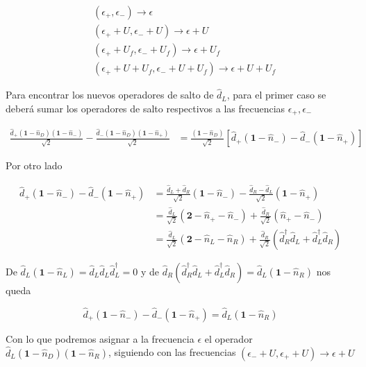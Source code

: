\begin{appendixs}
\begin{align*}
    &(\epsilon_{+},\epsilon_{-})  \to \epsilon \\
    &(\epsilon_{+}+U,\epsilon_{-}+U)  \to \epsilon+U \\
    &(\epsilon_{+}+U_{f},\epsilon_{-}+U_{f})  \to \epsilon+U_{f} \\
    &(\epsilon_{+}+U+U_{f},\epsilon_{-}+U+U_{f})  \to \epsilon+U+U_{f} 
\end{align*}

Para encontrar los nuevos operadores de salto de $\hat{d}_{L}$, para el primer caso se deberá sumar los operadores de salto respectivos a las frecuencias $\epsilon_{+},\epsilon_{-}$ 

\begin{align*}
    \frac{\hat{d}_{+}(\textbf{1}-\hat{n}_{D})(\textbf{1}-\hat{n}_{-})}{\sqrt{2}} - \frac{\hat{d}_{-}(\textbf{1}-\hat{n}_{D})(\textbf{1}-\hat{n}_{+})}{\sqrt{2}} & = \frac{(\textbf{1}-\hat{n}_{D})}{\sqrt{2}} [\hat{d}_{+}(\textbf{1}-\hat{n}_{-}) - \hat{d}_{-}(\textbf{1}-\hat{n}_{+}) ]
\end{align*}

Por otro lado

\begin{align*}
    \hat{d}_{+}(\textbf{1}-\hat{n}_{-}) - \hat{d}_{-}(\textbf{1}-\hat{n}_{+}) & = \frac{\hat{d}_{L} + \hat{d}_{R}}{\sqrt{2}} (\textbf{1} - \hat{n}_{-}) - \frac{\hat{d}_{R} - \hat{d}_{L}}{\sqrt{2}}(\textbf{1}-\hat{n}_{+}) \\
    & = \frac{\hat{d}_{L}}{\sqrt{2}}(\textbf{2} - \hat{n}_{+} -\hat{n}_{-} ) + \frac{\hat{d}_{R}}{\sqrt{2}}(\hat{n}_{+} -\hat{n}_{-}) \\
    & = \frac{\hat{d}_{L}}{\sqrt{2}}(\textbf{2}-\hat{n}_{L} -\hat{n}_{R}) + \frac{\hat{d}_{R}}{\sqrt{2}}(\hat{d}^{\dagger}_{R}\hat{d}_{L}+\hat{d}^{\dagger}_{L}\hat{d}_{R})
\end{align*}

De $\hat{d}_{L}(\textbf{1} - \hat{n}_{L}) = \hat{d}_{L}\hat{d}_{L}\hat{d}^{\dagger}_{L} = 0$ y de $\hat{d}_{R}(\hat{d}^{\dagger}_{R}\hat{d}_{L} + \hat{d}^{\dagger}_{L}\hat{d}_{R}) = \hat{d}_{L}(\textbf{1}-\hat{n}_{R})$ nos queda

\begin{equation*}
    \hat{d}_{+}(\textbf{1}-\hat{n}_{-}) - \hat{d}_{-}(\textbf{1}-\hat{n}_{+})  = \hat{d}_{L}(\textbf{1} - \hat{n}_{R})
\end{equation*}

Con lo que podremos asignar a la frecuencia $\epsilon$ el operador $\hat{d}_{L}(\textbf{1}-\hat{n}_{D})(\textbf{1}-\hat{n}_{R})$, siguiendo con las frecuencias $(\epsilon_{-}+U,\epsilon_{+}+U) \to \epsilon + U$


\end{appendixs}
